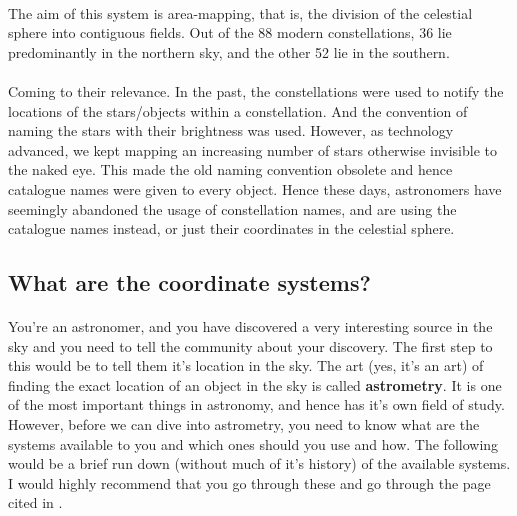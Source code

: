 \documentclass[a4paper,twoside]{article}
\numberwithin{equation}{section}
\begin{document}
\paragraph{}
The aim of this system is area-mapping, that is, the division of the celestial sphere into  contiguous fields. Out of the 88 modern constellations, 36 lie predominantly in the northern sky, and the other 52 lie in the southern. 
\paragraph{}
Coming to their relevance. In the past, the constellations were used to notify the locations of the stars/objects within a constellation. And the convention of naming the stars with their brightness was used. However, as technology advanced, we kept mapping an increasing number of stars otherwise invisible to the naked eye. This made the old naming convention obsolete and hence catalogue names were given to every object. Hence these days, astronomers have seemingly abandoned the usage of constellation names, and are using the catalogue names instead, or just their coordinates in the celestial sphere. 

\subsection{What are the coordinate systems?}
\paragraph{}
You're an astronomer, and you have discovered a very interesting source in the sky and you need to tell the community about your discovery. The first step to this would be to tell them it's location in the sky. The art (yes, it's an art) of finding the exact location of an object in the sky is called \textbf{astrometry}. It is one of the most important things in astronomy, and hence has it's own field of study. However, before we can dive into astrometry, you need to know what are the systems available to you and which ones should you use and how. The following would be a brief run down (without much of it's history) of the available systems. I would highly recommend that you go through these and go through the page cited in \cite{astrometry_wiki}. 
\end{document}
